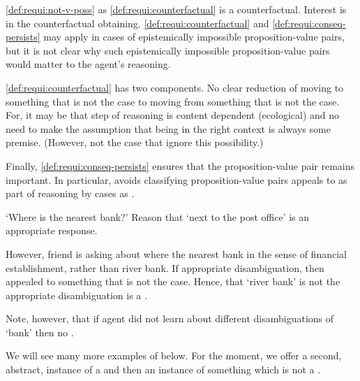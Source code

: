 \begin{note}
  \ref{def:requi:not-v-poss} as \ref{def:requi:counterfactual} is a counterfactual.
  Interest is in the counterfactual obtaining.
  \ref{def:requi:counterfactual} and \ref{def:requi:conseq-persists} may apply in cases of epistemically impossible proposition-value pairs, but it is not clear why such epistemically impossible proposition-value pairs would matter to the agent's reasoning.

  \ref{def:requi:counterfactual} has two components.
  No clear reduction of moving to something that is not the case to moving from something that is not the case.
  For, it may be that step of reasoning is content dependent {\color{red} (ecological)} and no need to make the assumption that being in the right context is always some premise.
  (However, not the case that ignore this possibility.)

  Finally, \ref{def:requi:conseq-persists} ensures that the proposition-value pair remains important.
  In particular, avoids classifying proposition-value pairs appeals to as part of reasoning by cases as .
\end{note}

\begin{note}
  \begin{illustration}
    `Where is the nearest bank?'
    Reason that `next to the post office' is an appropriate response.
  \end{illustration}
  However, friend is asking about where the nearest bank in the sense of financial establishment, rather than river bank.
  If appropriate disambiguation, then appealed to something that is not the case.
  Hence, that `river bank' is not the appropriate disambiguation is a \requ{}.

  Note, however, that if agent did not learn about different disambiguations of `bank' then no \requ{}.
\end{note}

\begin{note}
  We will see many more examples of  below.
  For the moment, we offer a second, abstract, instance of a \requ{} and then an instance of something which is not a \requ{}.
\end{note}

